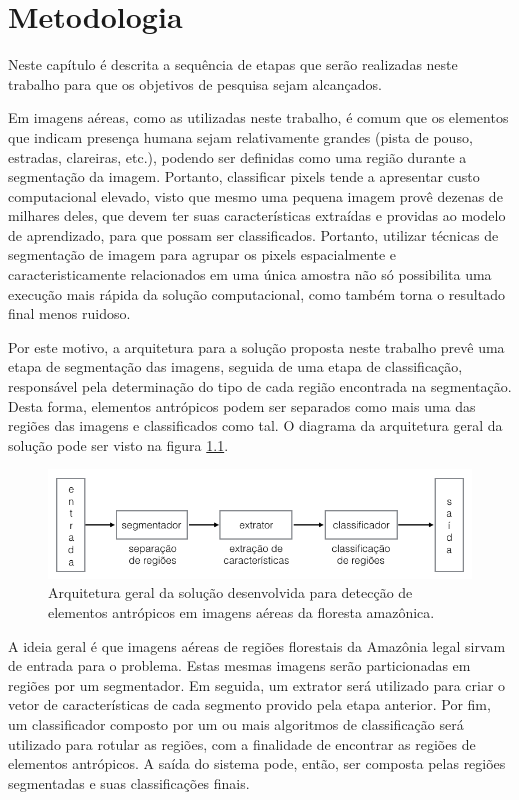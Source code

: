 \chapter{Metodologia}\label{cap:metodologia}

Neste capítulo é descrita a sequência de etapas que serão realizadas neste trabalho para que os objetivos de pesquisa sejam alcançados.

Em imagens aéreas, como as utilizadas neste trabalho, é comum que os elementos que indicam presença humana sejam relativamente grandes (pista de pouso, estradas, clareiras, etc.), podendo ser definidas como uma região durante a segmentação da imagem. Portanto, classificar pixels tende a apresentar custo computacional elevado, visto que mesmo uma pequena imagem provê dezenas de milhares deles, que devem ter suas características extraídas e providas ao modelo de aprendizado, para que possam ser classificados. Portanto, utilizar técnicas de segmentação de imagem para agrupar os pixels espacialmente e caracteristicamente relacionados em uma única amostra não só possibilita uma execução mais rápida da solução computacional, como também torna o resultado final menos ruidoso.

Por este motivo, a arquitetura para a solução proposta neste trabalho prevê uma etapa de segmentação das imagens, seguida de uma etapa de classificação, responsável pela determinação do tipo de cada região encontrada na segmentação. Desta forma, elementos antrópicos podem ser separados como mais uma das regiões das imagens e classificados como tal. O diagrama da arquitetura geral da solução pode ser visto na figura \ref{fig:metDiagramaGeral}.

\begin{figure}[h]
    \includegraphics[width=\textwidth]{imgs/arquitetura_geral}
    \caption{Arquitetura geral da solução desenvolvida para detecção de elementos antrópicos em imagens aéreas da floresta amazônica.}
    \label{fig:metDiagramaGeral}
\end{figure}

A ideia geral é que imagens aéreas de regiões florestais da Amazônia legal sirvam de entrada para o problema. Estas mesmas imagens serão particionadas em regiões por um segmentador. Em seguida, um extrator será utilizado para criar o vetor de características de cada segmento provido pela etapa anterior. Por fim, um classificador composto por um ou mais algoritmos de classificação será utilizado para rotular as regiões, com a finalidade de encontrar as regiões de elementos antrópicos. A saída do sistema pode, então, ser composta pelas regiões segmentadas e suas classificações finais.

